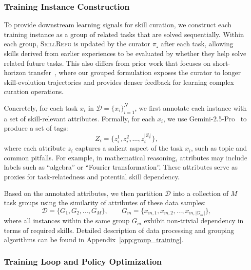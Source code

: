 \subsubsection{Training Instance Construction}\label{sec:training_instance_construction}

To provide downstream learning signals for skill curation, we construct each training instance as a group of related tasks that are solved sequentially. Within each group, \textsc{SkillRepo} is updated by the curator $\pi_{\mathcal{s}}$ after each task, allowing skills derived from earlier experiences to be evaluated by whether they help solve related future tasks.
This also differs from prior work that focuses on short-horizon transfer~\citep{DBLP:journals/corr/abs-2512-17102, DBLP:journals/corr/abs-2602-10652}, where our grouped formulation exposes the curator to longer skill-evolution trajectories and provides denser feedback for learning complex curation operations.  

Concretely, for each task $x_i$ in $\mathcal{D}=\{x_i\}_{i=1}^{N}$, we first annotate each instance with a set of skill-relevant attributes. Formally, for each $x_i$, we use Gemini-2.5-Pro~\citep{DBLP:journals/corr/abs-2507-06261} to produce a set of tags:
\vspace{-1mm}
\[
Z_i = \{z_i^{1}, z_i^{2}, \dots, z_i^{|Z_i|}\},
\]
where each attribute $z_i$ captures a salient aspect of the task $x_i$, such as topic and common pitfalls. For example, in mathematical reasoning, attributes may include labels such as ``algebra'' or ``Fourier transformation''. These attributes serve as proxies for task-relatedness and potential skill dependency.

Based on the annotated attributes, we then partition $\mathcal{D}$ into a collection of $M$ task groups using the similarity of attributes of these data samples:
\vspace{-1mm}
\[
\mathcal{D}=\{G_1, G_2, \dots, G_{M}\}, \qquad G_m = \{x_{m,1}, x_{m,2}, \dots, x_{m,|G_m|}\},
\]
where all instances within the same group $G_m$ exhibit non-trivial dependency in terms of required skills. Detailed description of data processing and grouping algorithms can be found in Appendix~\ref{app:group_training}.


\subsubsection{Training Loop and Policy Optimization}\label{sec:reward_design} 

